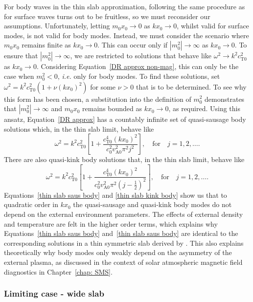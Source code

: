 For body waves in the thin slab approximation, following the same procedure as for surface waves turns out to be fruitless, so we must reconsider our assumptions. Unfortunately, letting $m_0x_0 \to 0$ as $kx_0 \to 0$, whilst valid for surface modes, is not valid for body modes. Instead, we must consider the scenario where $m_0x_0$ remains finite as $kx_0 \to 0$. This can occur only if $|m_0^2| \to \infty$ as $kx_0 \to 0$.  To ensure that $|m_0^2| \to \infty$, we are restricted to solutions that behave like $\omega^2 \to k^2c_\textrm{T0}^2$ as $kx_0 \to 0$. Considering Equation~\eqref{DR approx non-mag}, this can only be the case when $m_0^2 < 0$, \textit{i.e.} only for body modes. To find these solutions, set $\omega^2 = k^2c_\textrm{T0}^2(1 + \nu(kx_0)^2)$ for some $\nu > 0$ that is to be determined. To see why this form has been chosen, a substitution into the definition of $m_0^2$ demonstrates that $|m_0^2| \to \infty$ and $m_0x_0$ remains bounded as $kx_0 \to 0$, as required. Using this ansatz, Equation~\eqref{DR approx} has a countably infinite set of quasi-sausage body solutions which, in the thin slab limit, behave like
\begin{equation}
\omega^2 = k^2c_\textrm{T0}^2\left[1 + \frac{c_\textrm{T0}^4(kx_0)^2}{c_0^2v_\textrm{A0}^2\pi^2j^2}\right], \quad \text{for} \quad j = 1, 2, \ldots. \label{thin slab saus body}
\end{equation}
There are also quasi-kink body solutions that, in the thin slab limit, behave like
\begin{equation}
\omega^2 = k^2c_\textrm{T0}^2\left[1 + \frac{c_\textrm{T0}^4(kx_0)^2}{c_0^2v_\textrm{A0}^2\pi^2(j - \frac{1}{2})^2}\right], \quad \text{for} \quad j = 1, 2, \ldots. \label{thin slab kink body}
\end{equation}
Equations~\eqref{thin slab saus body} and \eqref{thin slab kink body} show us that to quadratic order in $kx_0$ the quasi-sausage and quasi-kink body modes do not depend on the external environment parameters. The effects of external density and temperature are felt in the higher order terms, which explains why Equations~\eqref{thin slab saus body} and~\eqref{thin slab saus body} are identical to the corresponding solutions in a thin symmetric slab derived by \citealt{rob81b}. This also explains theoretically why body modes only weakly depend on the asymmetry of the external plasma, as discussed in the context of solar atmospheric magnetic field diagnostics in Chapter~\ref{chap: SMS}.


\subsubsection{Limiting case - wide slab} \label{sec: wide slab}

